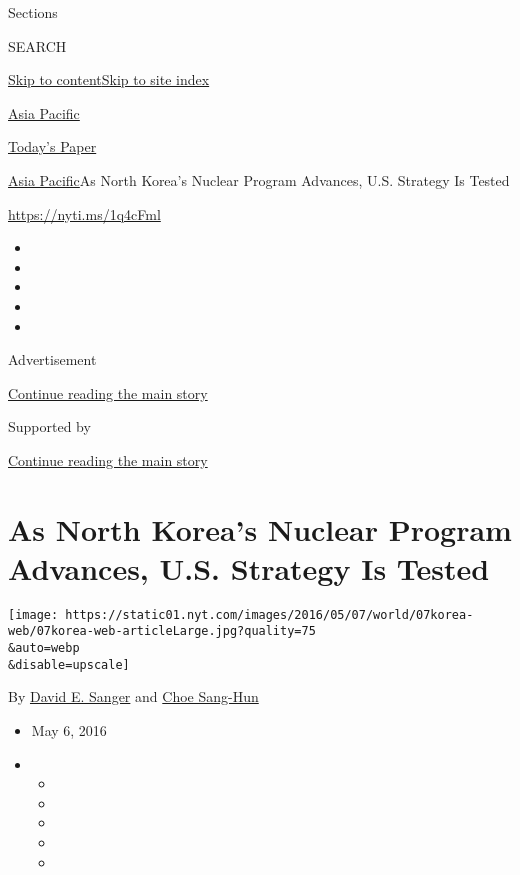 Sections

SEARCH

\protect\hyperlink{site-content}{Skip to
content}\protect\hyperlink{site-index}{Skip to site index}

\href{https://www.nytimes.com/section/world/asia}{Asia Pacific}

\href{https://myaccount.nytimes.com/auth/login?response_type=cookie\&client_id=vi}{}

\href{https://www.nytimes.com/section/todayspaper}{Today's Paper}

\href{/section/world/asia}{Asia Pacific}\textbar{}As North Korea's
Nuclear Program Advances, U.S. Strategy Is Tested

\url{https://nyti.ms/1q4cFml}

\begin{itemize}
\item
\item
\item
\item
\item
\end{itemize}

Advertisement

\protect\hyperlink{after-top}{Continue reading the main story}

Supported by

\protect\hyperlink{after-sponsor}{Continue reading the main story}

\hypertarget{as-north-koreas-nuclear-program-advances-us-strategy-is-tested}{%
\section{As North Korea's Nuclear Program Advances, U.S. Strategy Is
Tested}\label{as-north-koreas-nuclear-program-advances-us-strategy-is-tested}}

\texttt{[image: https://static01.nyt.com/images/2016/05/07/world/07korea-web/07korea-web-articleLarge.jpg?quality=75\\\&auto=webp\\\&disable=upscale]}

By \href{http://www.nytimes.com/by/david-e-sanger}{David E. Sanger} and
\href{http://www.nytimes.com/by/choe-sang-hun}{Choe Sang-Hun}

\begin{itemize}
\item
  May 6, 2016
\item
  \begin{itemize}
  \item
  \item
  \item
  \item
  \item
  \end{itemize}
\end{itemize}

